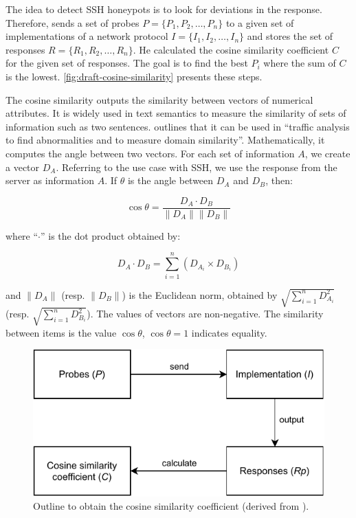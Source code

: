 The idea to detect SSH honeypots is to look for deviations in the response.
Therefore, \citet{vetterl2020} sends a set of probes $P = \{P_1, P_2, \dots, P_n\}$ to a given set of implementations of a network protocol $I = \{I_1, I_2, \dots, I_n\}$ and stores the set of responses $R = \{R_1, R_2, \dots, R_n\}$.
He calculated the cosine similarity coefficient $C$ for the given set of responses.
The goal is to find the best $P_i$ where the sum of $C$ is the lowest.
\autoref{fig:draft-cosine-similarity} presents these steps.

The cosine similarity outputs the similarity between vectors of numerical attributes.
It is widely used in text semantics to measure the similarity of sets of information such as two sentences.
\citet{vetterl2020} outlines that it can be used in \enquote{traffic analysis to find abnormalities and to measure domain similarity}.
Mathematically, it computes the angle between two vectors.
For each set of information $A$, we create a vector $D_A$.
Referring to the use case with SSH, we use the response from the server as information $A$.
If $\theta$ is the angle between $D_A$ and $D_B$, then:

\begin{equation} \label{eq:cosine-similarity}
    \cos \theta = \frac{D_A \cdot D_B}{\|D_A\| \|D_B\|}
\end{equation}

where \enquote{$\cdot$} is the dot product obtained by:

\begin{equation}
    D_A \cdot D_B = \sum_{i=1}^{n} (D_{A_i} \times D_{B_i})
\end{equation}

and $\|D_A\|$ (resp. $\|D_B\|$) is the Euclidean norm, obtained by $\sqrt{\sum_{i=1}^{n} D_{A_i}^2}$ (resp. $\sqrt{\sum_{i=1}^{n} D_{B_i}^2}$).
The values of vectors are non-negative.
The similarity between items is the value $\cos \theta$, $\cos \theta = 1$ indicates equality.

\begin{figure}
    \centering
    \includegraphics{figures/vetterl_concept.pdf}
    \caption[Outline to obtain the cosine similarity coefficient]{
        Outline to obtain the cosine similarity coefficient (derived from \cite{vetterl2020}).
    }
    \label{fig:draft-cosine-similarity}
\end{figure}

